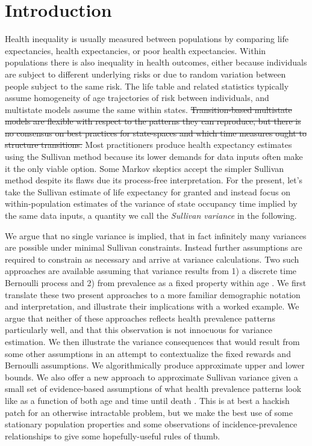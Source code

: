 \documentclass{bmcart}
\begin{document}
\section*{Introduction}
Health inequality is usually measured between populations by comparing life expectancies, health expectancies, or poor health expectancies. Within populations there is also inequality in health outcomes, either because individuals are subject to different underlying risks or due to random variation between people subject to the same risk. The life table and related statistics typically assume homogeneity of age trajectories of risk between individuals, and multistate models assume the same within states. \sout{Transition-based multistate models are flexible with respect to the patterns they can reproduce, but there is no consensus on best practices for state-spaces and which time measures ought to structure transitions.} Most practitioners produce health expectancy estimates using the Sullivan method \citep{sullivan1971single} because its lower demands for data inputs often make it the only viable option. Some Markov skeptics accept the simpler Sullivan method despite its flaws due its process-free interpretation. For the present, let's take the Sullivan estimate of life expectancy for granted and instead focus on within-population estimates of the variance of state occupancy time implied by the same data inputs, a quantity we call the \emph{Sullivan variance} in the following. 

We argue that no single variance is implied, that in fact infinitely many variances are possible under minimal Sullivan constraints. Instead further assumptions are required to constrain as necessary and arrive at variance calculations. Two such approaches are available assuming that variance results from 1) a discrete time Bernoulli process and 2) from prevalence as a fixed property within age \citep{caswell2018matrix}. We first translate these two present approaches to a more familiar demographic notation and interpretation, and illustrate their implications with a worked example. We argue that neither of these approaches reflects health prevalence patterns particularly well, and that this observation is not innocuous for variance estimation. We then illustrate the variance consequences that would result from some other assumptions in an attempt to contextualize the fixed rewards and Bernoulli assumptions. We algorithmically produce approximate upper and lower bounds. We also offer a new approach to approximate Sullivan variance given a small set of evidence-based assumptions of what health prevalence patterns look like as a function of both age and time until death \citep{klijs2010disability, riffe2016time, riffe2017hle}. This is at best a hackish patch for an otherwise intractable problem, but we make the best use of some stationary population properties and some observations of incidence-prevalence relationships to give some hopefully-useful rules of thumb. 
\end{document}
